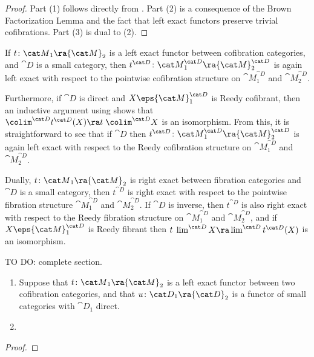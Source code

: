 {\begin{proof}
Part (1) follows directly from . Part (2) is a consequence of the Brown Factorization Lemma and the fact that left exact functors preserve trivial cofibrations. Part (3) is dual to (2).
\end{proof}

If $t \colon {\cat M}_1 \ra {\cat M}_2$ is a left exact functor between cofibration categories, and ${\cat D}$ is a small category, then $t^{\cat D} \colon {\cat M}_1^{\cat D} \ra {\cat M}_2^{\cat D}$ is again left exact with respect to the pointwise cofibration structure on ${\cat M}_1^{\cat D}$ and ${\cat M}_2^{\cat D}$. 

Furthermore, if ${\cat D}$ is direct and $X \eps {\cat M}_1^{\cat D}$ is Reedy cofibrant, then an inductive argument using  shows that $\colim^{\cat D} t^{\cat D}(X) \ra t \; \colim^{\cat D}X$ is an isomorphism. From this, it is straightforward to see that if ${\cat D}$ then $t^{\cat D} \colon {\cat M}_1^{\cat D} \ra {\cat M}_2^{\cat D}$ is again left exact with respect to the Reedy cofibration structure on ${\cat M}_1^{\cat D}$ and ${\cat M}_2^{\cat D}$.

Dually, $t \colon {\cat M}_1 \ra {\cat M}_2$ is right exact between fibration categories and ${\cat D}$ is a small category, then $t^{\cat D}$ is right exact with respect to the pointwise fibration structure ${\cat M}_1^{\cat D}$ and ${\cat M}_2^{\cat D}$. If ${\cat D}$ is inverse, then $t^{\cat D}$ is also right exact with respect to the Reedy fibration structure on ${\cat M}_1^{\cat D}$ and ${\cat M}_2^{\cat D}$, and if $X \eps {\cat M}_1^{\cat D}$ is Reedy fibrant then $t \; \lim^{\cat D}X \ra \lim^{\cat D} t^{\cat D}(X)$ is an isomorphism.

TO DO: complete section.

\begin{prop}
\label{prop:leftexactpreservecolim}
\mbox{}
\begin{enumerate}
\item
Suppose that $t \colon {\cat M}_1 \ra {\cat M}_2$ is a left exact functor between two cofibration categories, and that $u \colon {\cat D}_1 \ra {\cat D}_2$ is a functor of small categories with ${\cat D}_1$ direct.
\item
\end{enumerate}
\end{prop}

\begin{proof}
\end{proof}
\bigskip

} %

